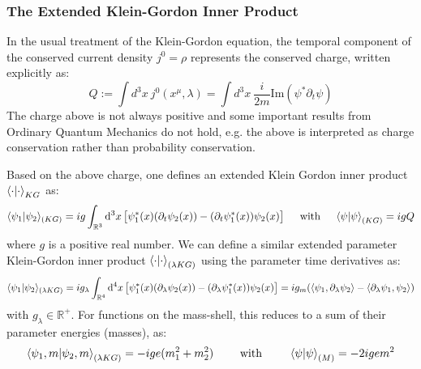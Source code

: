 \documentclass[twoside,a4paper,11pt]{article}
\numberwithin{equation}{section}
\begin{document}
\iffalse

\begin{equation}
    \partial_\mu\partial^\mu = (\partial_t)^2 - \nabla^2 \qquad  \stackrel{t \to it}{\rightarrow} \qquad \partial_\mu\partial^\mu = - (\partial_t)^2 - \nabla^2
\end{equation}

For the quantum harmonic oscillator (QHO), this would correspond to:
\begin{equation}
    \hat{H}_0 \ket{\psi}_{stat}  = i \dfrac{\partial \ket{\psi}_{stat} }{\partial \lambda} =  \omega \left( n + \frac{1}{2} \right) \ket{\psi}_{stat}   \iff \left[ \hat{H}_0 -  \omega \left( n + \frac{1}{2} \right) \right] \ket{\psi}_{stat}  = 0  
\end{equation}
\fi 




\subsubsection{The Extended Klein-Gordon Inner Product}
In the usual treatment of the Klein-Gordon equation, the temporal component of the conserved current density  $j^0 = \rho$ represents the conserved charge, written explicitly as:
\begin{equation}
Q := \int d^3 x \ j^0(x^\mu, \lambda)  = \int d^3x \ \frac{i}{2m}\text{Im}( \psi^* \partial_t \psi )
\end{equation}
The charge above is not always positive and some important results from Ordinary Quantum Mechanics do not hold, e.g. the above is interpreted as charge conservation rather than probability conservation. 

Based on the above charge, one defines an extended Klein Gordon inner product $\braket{\cdot|\cdot}_{KG}$ as:
\begin{equation}
    \langle \psi _{1}|\psi _{2}\rangle_{(KG)} = i g \int_{\mathbb{R}^3} {\mathrm  {d}}^3 x \left[\psi _{1}^{\ast }(x) ( \partial_t\psi_{2}(x))  - (\partial_t\psi_{1}^{\ast }(x) )\psi _{2}(x) \right] \quad \text{ with } \quad \braket{\psi|\psi}_{(KG)} = ig Q
\end{equation}
where $g$ is a positive real number. We can define a similar extended parameter Klein-Gordon inner product $\braket{\cdot|\cdot}_{(\lambda KG)}$ using the parameter time derivatives as:
\begin{equation}
    \langle \psi _{1}|\psi _{2}\rangle_{(\lambda KG)} = i g_\lambda \int_{\mathbb{R}^4} {\mathrm  {d}}^4 x \left[\psi _{1}^{\ast }(x) ( \partial_\lambda\psi_{2}(x))  - (\partial_\lambda\psi_{1}^{\ast }(x) )\psi _{2}(x) \right] = i g_m (\braket{\psi_1, \partial_\lambda \psi_2} - \braket{\partial_\lambda \psi_1, \psi_2})
\end{equation}
with $g_\lambda \in \mathbb{R}^+$. For functions on the mass-shell, this reduces to a sum of their parameter energies (masses), as:
\begin{equation}
\braket{\psi_1,m|\psi_2,m}_{(\lambda KG)} = -ige (m_1^2 + m_2^2) \qquad \text{ with } \qquad \braket{\psi|\psi}_{(M)} = -2 ige  m^2
\end{equation}
\end{document}
